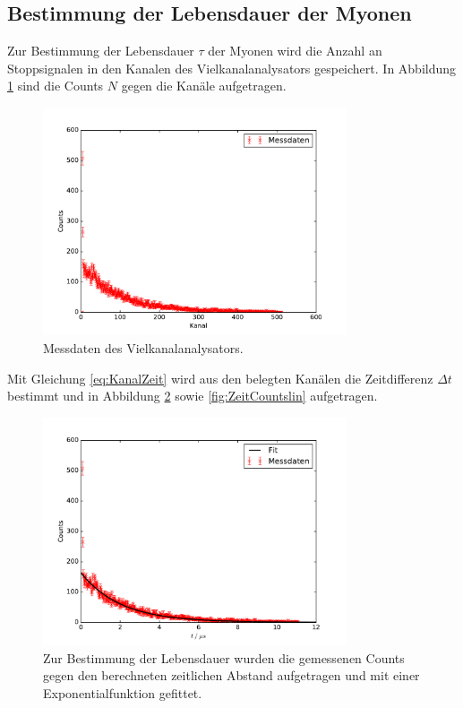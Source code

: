 \subsection{Bestimmung der Lebensdauer der Myonen}
Zur Bestimmung der Lebensdauer $\tau$ der Myonen wird die Anzahl an Stoppsignalen in den Kanalen des Vielkanalanalysators gespeichert.
In Abbildung \ref{fig:KanalCount} sind die Counts $N$ gegen die Kanäle aufgetragen.
\begin{figure}
  \centering
  \includegraphics[width=0.8\textwidth]{plots/KanalCounts.pdf}
  \caption{Messdaten des Vielkanalanalysators.}
  \label{fig:KanalCount}
\end{figure}
Mit Gleichung \ref{eq:KanalZeit} wird aus den belegten Kanälen die Zeitdifferenz $\Delta t$ bestimmt und in Abbildung
\ref{fig:ZeitCounts} sowie \ref{fig:ZeitCountslin} aufgetragen.
\begin{figure}
  \centering
  \includegraphics[width=0.8\textwidth]{plots/ZeitCounts.pdf}
  \caption{Zur Bestimmung der Lebensdauer wurden die gemessenen Counts gegen den berechneten
    zeitlichen Abstand aufgetragen und mit einer Exponentialfunktion gefittet.}
  \label{fig:ZeitCounts}
\end{figure}
